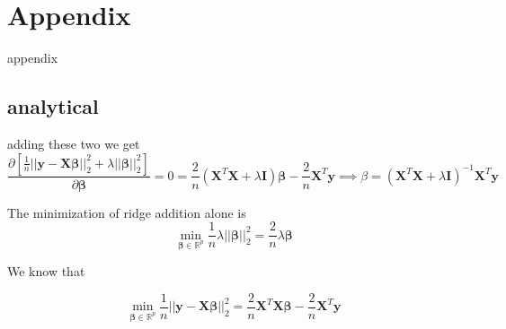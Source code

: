 \documentclass[twoside,11pt]{report}
\begin{document}
%
%
%
%
%
%
%
%
%
%
%
%
%
%




























%
%
\newpage
\appendix
{}%
\section*{Appendix}
\label{app:appendix}

appendix



%
\subsection*{analytical}
\label{app:analytical}




adding these two we get
$$
    \frac{\partial \left[\frac{1}{n}\vert\vert \mathbf{y}-\mathbf{X}\mathbf{\beta}\vert\vert_2^2+\lambda\vert\vert \mathbf{\beta}\vert\vert_2^2\right]}{\partial{\mathbf{\beta}}} = 0 = \frac{2}{n}\left(\mathbf{X}^T\mathbf{X}+\lambda\mathbf{I}\right)\mathbf{\beta}-\frac{2}{n}\mathbf{X}^T\mathbf{y} \implies \beta = \left(\mathbf{X}^T\mathbf{X}+\lambda\mathbf{I}\right)^{-1}\mathbf{X}^T\mathbf{y}
$$



The minimization of ridge addition alone is
$${\displaystyle \min_{\mathbf{\beta}\in
{\mathbb{R}}^{p}}}\frac{1}{n} \lambda \vert\vert \mathbf{\beta}\vert\vert_2^2 = \frac{2}{n} \lambda \mathbf{\beta}$$




We know that

$$
{\displaystyle \min_{\mathbf{\beta}\in
{\mathbb{R}}^{p}}}\frac{1}{n} \vert\vert\mathbf{y}- \mathbf{X}\mathbf{\beta}\vert\vert_2^2 = \frac{2}{n} \mathbf{X}^T\mathbf{X}\mathbf{\beta}-\frac{2}{n}\mathbf{X}^T\mathbf{y}
$$
\end{document}
